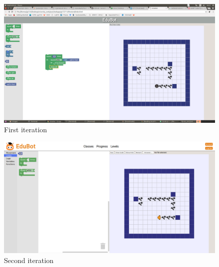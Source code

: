 \documentclass[a4wide, 11pt]{article}
\begin{document}
\begin{figure}[h]
  \includegraphics[scale=0.18]{prototype2.png}
  \centering
  \caption{First iteration}
\end{figure}

\begin{figure}[h]
  \includegraphics[scale=0.18]{play.png}
  \centering
  \caption{Second iteration}
\end{figure}
\end{document}

